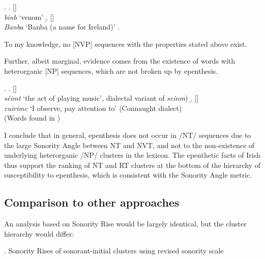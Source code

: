 \documentclass[12pt]{article}
\begin{document}
\ex. \a. [] \\
         {\it binb} `venom'
     \b. [] \\
         {\it Banba} `Banba (a name for Ireland)'
     \z.
     \citep[2c]{carnie.1994}

To my knowledge, no [NVP] sequences with the properties stated above exist.

Further, albeit marginal, evidence comes from the existence of words with heterorganic [NP] sequences,
which are not broken up by epenthesis.

\ex. \a. [] \\
         {\it s\'eimt} `the act of playing music', dialectal variant of {\it seinm})
     \b. [] \\
         {\it cuirimc} `I observe, pay attention to' (Connaught dialect) \\
     (Words found in \citet{dineen.2007})

I conclude that in general, epenthesis does not occur in /NT/ sequences due to the large {\sc Sonority Angle} between NT and NVT, and not to the non-existence of underlying heterorganic /NP/ clusters in the lexicon. The epenthetic facts of Irish thus support the ranking of NT and RT clusters at the bottom of the hierarchy of susceptibility to epenthesis, which is consistent with the {\sc Sonority Angle} metric.

\subsection{Comparison to other approaches}

An analysis based on {\sc Sonority Rise} \citep{flemming.2008} would be largely identical, but the cluster hierarchy would differ:

\ex. {\sc Sonority Rises}  of sonorant-initial clusters using revised sonority scale
\end{document}
